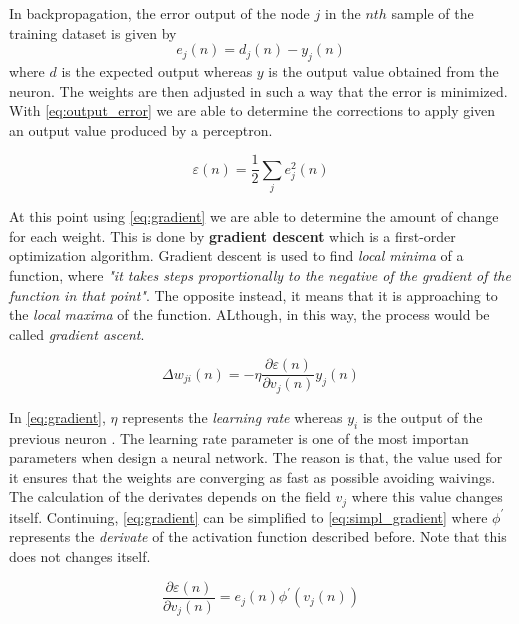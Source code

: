 \noindent In backpropagation, the error output of the node $j$ in the $nth$ sample of the training dataset is given by
\begin{equation}
    e_{j}(n) = d_{j}(n) - y_{j}(n)
\end{equation}
where $d$ is the expected output whereas $y$ is the output value obtained from the neuron. The weights are then adjusted in such a way that the error is minimized. With \ref{eq:output_error} we are able to determine the corrections to apply given an output value produced by a perceptron.

\begin{equation}\label{eq:output_error}
    \varepsilon (n) = \frac{1}{2}\sum_{j} e^2_{j}(n)
\end{equation}

\noindent At this point using \ref{eq:gradient} we are able to determine the amount of change for each weight. This is done by \textbf{gradient descent} which is a first-order optimization algorithm. Gradient descent is used to find \textit{local minima} of a function, where \textit{"it takes steps proportionally to the negative of the gradient of the function in that point"}\cite{gradient_wiki}. The opposite instead, it means that it is approaching to the \textit{local maxima} of the function. ALthough, in this way, the process would be called \textit{gradient ascent}\cite{gradient_wiki}.

\begin{equation}\label{eq:gradient}
    \Delta w_{ji}(n) = -\eta \frac{\partial \varepsilon (n)}{\partial v_{j} (n)}y_{j}(n)
\end{equation}

\noindent In \ref{eq:gradient}, $\eta$ represents the \textit{learning rate} whereas $y_{i}$ is the output of the previous neuron \cite{mlp_wiki}. The learning rate parameter is one of the most importan parameters when design a neural network. The reason is that, the value used for it ensures that the weights are converging as fast as possible avoiding waivings. \\

\noindent The calculation of the derivates depends on the field $v_{j}$ where this value changes itself. Continuing, \ref{eq:gradient} can be simplified to \ref{eq:simpl_gradient} where $\phi^{\prime}$ represents the \textit{derivate} of the activation function described before. Note that this does not changes itself.

\begin{equation}\label{eq:simpl_gradient}
    \frac{\partial \varepsilon (n)}{\partial v_{j} (n)} = e_{j}(n)\phi^{\prime}(v_{j}(n))
\end{equation}

